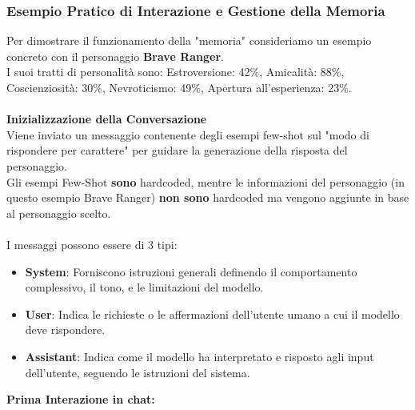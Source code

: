 \subsubsection{Esempio Pratico di Interazione e Gestione della Memoria}
Per dimostrare il funzionamento della "memoria" consideriamo un esempio concreto con il personaggio \textbf{Brave Ranger}.\\
I suoi tratti di personalità sono:
Estroversione: 42\%, Amicalità: 88\%, Coscienziosità: 30\%, Nevroticismo: 49\%, Apertura all'esperienza: 23\%.\\\\
\textbf{Inizializzazione della Conversazione}\\
Viene inviato un messaggio contenente degli esempi few-shot sul "modo di rispondere per carattere" per guidare la generazione della risposta del personaggio.\\
Gli esempi Few-Shot \textbf{sono} hardcoded, mentre le informazioni del personaggio (in questo esempio Brave Ranger) \textbf{non sono} hardcoded ma vengono aggiunte in base al personaggio scelto.\\\\
I messaggi possono essere di 3 tipi:
\begin{itemize}
    \item
    \textbf{System}:
    Forniscono istruzioni generali definendo il comportamento complessivo, il tono, e le limitazioni del modello.
    \item
    \textbf{User}:
    Indica le richieste o le affermazioni dell'utente umano a cui il modello deve rispondere.
    \item
    \textbf{Assistant}:
    Indica come il modello ha interpretato e risposto agli input dell'utente, seguendo le istruzioni del sistema.
\end{itemize}
\textbf{Prima Interazione in chat:}\\

